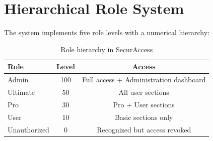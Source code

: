 \section{Hierarchical Role System}

The system implements five role levels with a numerical hierarchy:

\begin{table}[H]
    \centering
    \begin{tabular}{lcc}
        \toprule
        \textbf{Role} & \textbf{Level} & \textbf{Access} \\
        \midrule
        Admin        & 100 & Full access + Administration dashboard \\
        Ultimate     & 50  & All user sections \\
        Pro          & 30  & Pro + User sections \\
        User         & 10  & Basic sections only \\
        Unauthorized & 0   & Recognized but access revoked \\
        \bottomrule
    \end{tabular}
    \caption{Role hierarchy in SecurAccess}
\end{table}
